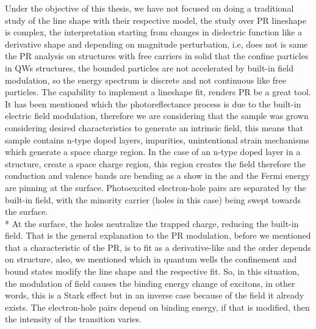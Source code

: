 Under the objective of this thesis, we have not focused on doing a traditional study of the line shape with their respective model, the study over PR lineshape is complex, the interpretation starting from changes in dielectric function like a derivative shape and depending on magnitude perturbation, i.e, does not is same the  PR analysis on structures with free carriers in solid that the confine particles in QWs structures, the bounded particles are not accelerated by built-in field modulation, so the energy spectrum is discrete and not continuous like free particles.  The capability to implement a lineshape fit,  renders PR be a great tool. 
It has been mentioned which the photoreflectance process is due to the built-in electric field modulation, therefore we are considering that the sample was grown considering desired characteristics to generate an intrinsic field, this means that sample contains n-type doped layers, impurities, unintentional strain mechanisms which generate a space charge region. In the case of an n-type doped layer in a structure, create a space charge region, this region creates the field therefore the conduction and valence bands are bending as a show in the  and the Fermi energy are pinning at the surface. Photoexcited electron-hole pairs are separated by the built-in field, with the
minority carrier (holes in this case) being swept towards the surface.\\*
At the surface, the holes neutralize the trapped charge, reducing the built-in field\cite{misiewicz1999photoreflectance}. That is the general explanation to the PR modulation, before we mentioned that a characteristic of the PR, is to fit as a derivative-like and the order depends on structure, also, we mentioned which in quantum wells the confinement and bound states modify the line shape and the respective fit. So, in this situation, the modulation of field causes the binding energy change of excitons, in other words, this is a Stark effect but in an inverse case because of the field it already exists. The electron-hole pairs depend on binding energy,  if that is modified, then the intensity of the transition varies.  




